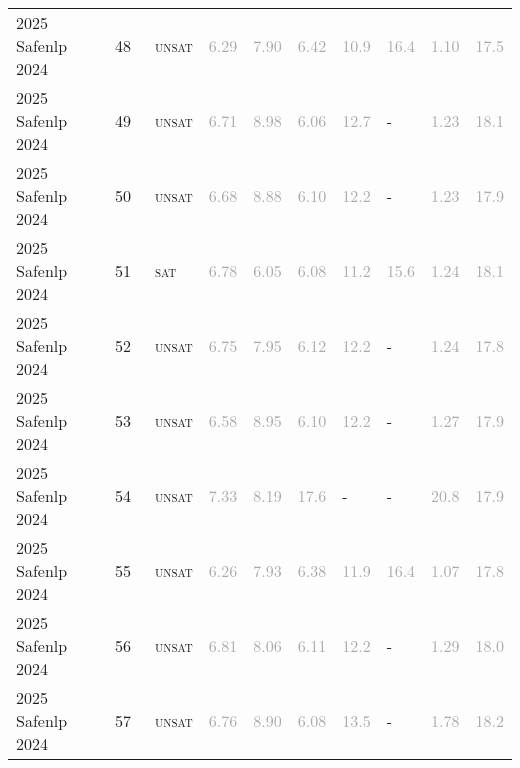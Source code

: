 \begin{center}
{\begin{longtable}{@{}llllllllll@{}}
2025 Safenlp 2024 & 48 & ~\textsc{unsat} & \textcolor{darkgray}{6.29} & \textcolor{darkgray}{7.90} & \textcolor{darkgray}{6.42} & \textcolor{darkgray}{10.9} & \textcolor{darkgray}{16.4} & \textcolor{darkgray}{1.10} & \textcolor{darkgray}{17.5} \\
2025 Safenlp 2024 & 49 & ~\textsc{unsat} & \textcolor{darkgray}{6.71} & \textcolor{darkgray}{8.98} & \textcolor{darkgray}{6.06} & \textcolor{darkgray}{12.7} & - & \textcolor{darkgray}{1.23} & \textcolor{darkgray}{18.1} \\
2025 Safenlp 2024 & 50 & ~\textsc{unsat} & \textcolor{darkgray}{6.68} & \textcolor{darkgray}{8.88} & \textcolor{darkgray}{6.10} & \textcolor{darkgray}{12.2} & - & \textcolor{darkgray}{1.23} & \textcolor{darkgray}{17.9} \\
2025 Safenlp 2024 & 51 & ~\textsc{sat} & \textcolor{darkgray}{6.78} & \textcolor{darkgray}{6.05} & \textcolor{darkgray}{6.08} & \textcolor{darkgray}{11.2} & \textcolor{darkgray}{15.6} & \textcolor{darkgray}{1.24} & \textcolor{darkgray}{18.1} \\
2025 Safenlp 2024 & 52 & ~\textsc{unsat} & \textcolor{darkgray}{6.75} & \textcolor{darkgray}{7.95} & \textcolor{darkgray}{6.12} & \textcolor{darkgray}{12.2} & - & \textcolor{darkgray}{1.24} & \textcolor{darkgray}{17.8} \\
2025 Safenlp 2024 & 53 & ~\textsc{unsat} & \textcolor{darkgray}{6.58} & \textcolor{darkgray}{8.95} & \textcolor{darkgray}{6.10} & \textcolor{darkgray}{12.2} & - & \textcolor{darkgray}{1.27} & \textcolor{darkgray}{17.9} \\
2025 Safenlp 2024 & 54 & ~\textsc{unsat} & \textcolor{darkgray}{7.33} & \textcolor{darkgray}{8.19} & \textcolor{darkgray}{17.6} & - & - & \textcolor{darkgray}{20.8} & \textcolor{darkgray}{17.9} \\
2025 Safenlp 2024 & 55 & ~\textsc{unsat} & \textcolor{darkgray}{6.26} & \textcolor{darkgray}{7.93} & \textcolor{darkgray}{6.38} & \textcolor{darkgray}{11.9} & \textcolor{darkgray}{16.4} & \textcolor{darkgray}{1.07} & \textcolor{darkgray}{17.8} \\
2025 Safenlp 2024 & 56 & ~\textsc{unsat} & \textcolor{darkgray}{6.81} & \textcolor{darkgray}{8.06} & \textcolor{darkgray}{6.11} & \textcolor{darkgray}{12.2} & - & \textcolor{darkgray}{1.29} & \textcolor{darkgray}{18.0} \\
2025 Safenlp 2024 & 57 & ~\textsc{unsat} & \textcolor{darkgray}{6.76} & \textcolor{darkgray}{8.90} & \textcolor{darkgray}{6.08} & \textcolor{darkgray}{13.5} & - & \textcolor{darkgray}{1.78} & \textcolor{darkgray}{18.2} \\

\end{longtable}}
\end{center}
